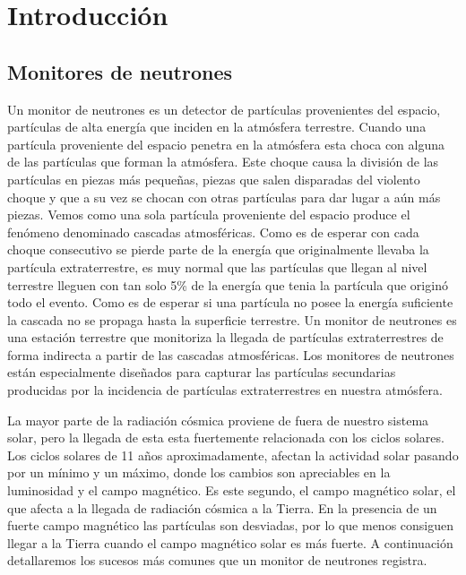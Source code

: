 \chapter{Introducción}
\label{cap1}

\section{Monitores de neutrones}
	
	Un monitor de neutrones es un detector de partículas provenientes del espacio, partículas de alta energía que inciden en la atmósfera terrestre. 
	Cuando una partícula proveniente del espacio penetra en la atmósfera esta choca con alguna de las partículas que forman la atmósfera. 
	Este choque causa la división de las partículas en piezas más pequeñas, piezas que salen disparadas del violento choque y que a su vez 
	se chocan con otras partículas para dar lugar a aún más piezas. Vemos como una sola partícula proveniente del espacio produce el fenómeno 
	denominado cascadas atmosféricas. Como es de esperar con cada choque consecutivo se pierde parte de la energía que originalmente llevaba la 
	partícula extraterrestre, es muy normal que las partículas que llegan al nivel terrestre lleguen con tan solo 5\% de la energía que tenia la 
	partícula que originó todo el evento. Como es de esperar si una partícula no posee la energía suficiente la cascada no se propaga hasta la 
	superficie terrestre. Un monitor de neutrones es una estación terrestre que monitoriza la llegada de partículas extraterrestres de forma 
	indirecta a partir de las cascadas atmosféricas. Los monitores de neutrones están especialmente diseñados para capturar las partículas 
	secundarias producidas por la incidencia de partículas extraterrestres en nuestra atmósfera.
	\par
	La mayor parte de la radiación cósmica proviene de fuera de nuestro sistema solar, pero la llegada de esta esta fuertemente relacionada con 
	los ciclos solares. Los ciclos solares de 11 años aproximadamente, afectan la actividad solar pasando por un mínimo y un máximo, donde los
	cambios son apreciables en la luminosidad y el campo magnético. Es este segundo, el campo magnético solar, el que afecta a la llegada de 
	radiación cósmica a la Tierra. En la presencia de un fuerte campo magnético las partículas son desviadas, por lo que menos consiguen llegar a
	la Tierra cuando el campo magnético solar es más fuerte. A continuación detallaremos los sucesos más comunes que un monitor de neutrones
	registra. 
